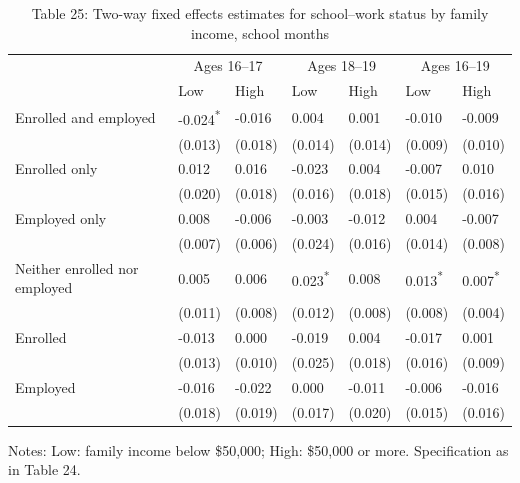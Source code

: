 \documentclass[12pt]{article}
\begin{document}
\begin{table}
\centering
\caption{Table 25: Two-way fixed effects estimates for school--work status by family income, school months}

\small
\begin{tabular}{p{}p{}p{}p{}p{}p{}p{}}
\toprule
 & \multicolumn{2}{c}{Ages 16--17} & \multicolumn{2}{c}{Ages 18--19} & \multicolumn{2}{c}{Ages 16--19} \\

 & Low & High & Low & High & Low & High \\
\midrule
Enrolled and employed & -0.024\textsuperscript{*} & -0.016 & 0.004 & 0.001 & -0.010 & -0.009 \\
 & (0.013) & (0.018) & (0.014) & (0.014) & (0.009) & (0.010) \\
Enrolled only & 0.012 & 0.016 & -0.023 & 0.004 & -0.007 & 0.010 \\
 & (0.020) & (0.018) & (0.016) & (0.018) & (0.015) & (0.016) \\
Employed only & 0.008 & -0.006 & -0.003 & -0.012 & 0.004 & -0.007 \\
 & (0.007) & (0.006) & (0.024) & (0.016) & (0.014) & (0.008) \\
Neither enrolled nor employed & 0.005 & 0.006 & 0.023\textsuperscript{*} & 0.008 & 0.013\textsuperscript{*} & 0.007\textsuperscript{*} \\
 & (0.011) & (0.008) & (0.012) & (0.008) & (0.008) & (0.004) \\
Enrolled & -0.013 & 0.000 & -0.019 & 0.004 & -0.017 & 0.001 \\
 & (0.013) & (0.010) & (0.025) & (0.018) & (0.016) & (0.009) \\
Employed & -0.016 & -0.022 & 0.000 & -0.011 & -0.006 & -0.016 \\
 & (0.018) & (0.019) & (0.017) & (0.020) & (0.015) & (0.016) \\
\bottomrule
\end{tabular}



\noindent\small Notes: Low: family income below \$50,000; High: \$50,000 or more. Specification as in Table 24.

\end{table}
\end{document}
